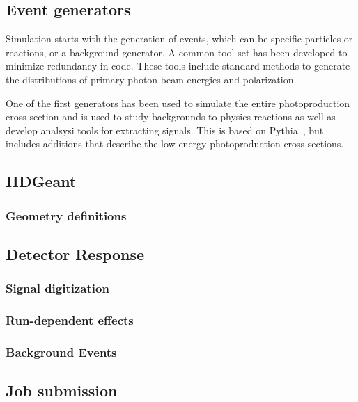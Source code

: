 \subsection{Event generators \label{sec:generators}}
Simulation starts with the generation of events, which can be specific particles or reactions, or a background generator. A common tool set has been developed to minimize redundancy in code. These tools include standard methods to generate the distributions of primary photon beam energies and polarization.

One of the first generators has been used to simulate the entire photoproduction cross section and is used to study backgrounds to physics reactions as well as develop analsysi tools for extracting signals. This is based on Pythia~\cite{Sjostrand:2006za}, but includes additions that describe the low-energy photoproduction cross sections. 


\subsection{HDGeant \label{sec:hdgeant}}

\subsubsection[Material thickness]{\label{sec:materialscan}Geometry definitions}


\subsection[mcsmear]{Detector Response}
\subsubsection{Signal digitization}
\subsubsection{Run-dependent effects}
\subsubsection{Background Events}

\subsection{Job submission \label{sec:jobsubmission}}
